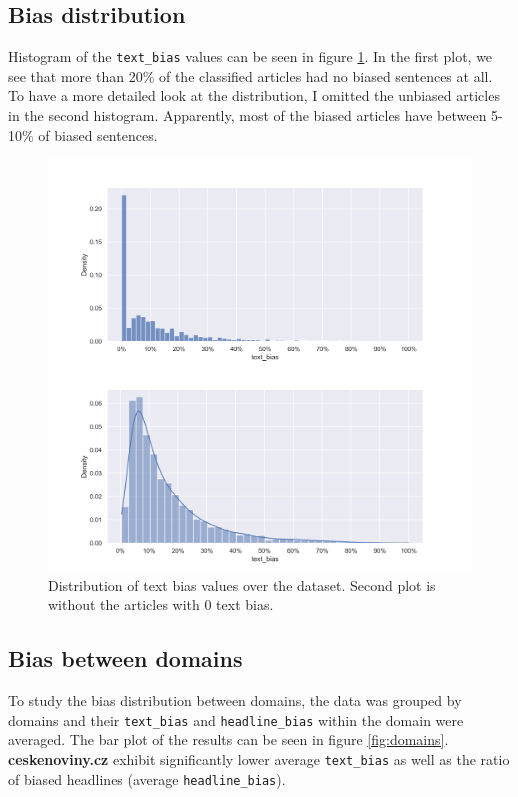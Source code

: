 \subsection{Bias distribution}
Histogram of the \verb|text_bias| values can be seen in figure \ref{fig:dists}. In the first plot, we see that more than 20\% of the classified articles had no biased sentences at all. To have a more detailed look at the distribution, I omitted the unbiased articles in the second histogram. Apparently, most of the biased articles have between 5-10\% of biased sentences.


\begin{figure}

  \includegraphics[scale=0.5]{my_modules/multimedia/inference/dists.jpg}
  \caption{Distribution of text bias values over the dataset. Second plot is without the articles with 0 text bias.}
  \label{fig:dists}

\end{figure}


\newpage
\subsection{Bias between domains}
To study the bias distribution between domains, the data was grouped by domains and their \verb|text_bias| and \verb|headline_bias| within the domain were averaged. The bar plot of the results can be seen in figure \ref{fig:domains}. \textbf{ceskenoviny.cz} exhibit significantly lower average \verb|text_bias| as well as the ratio of biased headlines (average \verb|headline_bias|).

